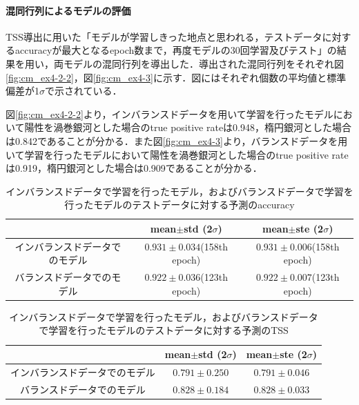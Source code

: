 \documentclass[a4j, 11pt]{jreport}
\begin{document}
\paragraph{混同行列によるモデルの評価}
TSS導出に用いた「モデルが学習しきった地点と思われる，テストデータに対するaccuracyが最大となるepoch数まで，再度モデルの30回学習及びテスト」の結果を用い，両モデルの混同行列を導出した．導出された混同行列をそれぞれ図\ref{fig:cm_ex4-2-2}，図\ref{fig:cm_ex4-3}に示す．図にはそれぞれ個数の平均値と標準偏差が1$\sigma$で示されている．

図\ref{fig:cm_ex4-2-2}より，インバランスドデータを用いて学習を行ったモデルにおいて陽性を渦巻銀河とした場合のtrue positive rateは0.948，楕円銀河とした場合は0.842であることが分かる．また図\ref{fig:cm_ex4-3}より，バランスドデータを用いて学習を行ったモデルにおいて陽性を渦巻銀河とした場合のtrue positive rateは0.919，楕円銀河とした場合は0.909であることが分かる．

\begin{table}[htbp]
  \centering
	\caption{インバランスドデータで学習を行ったモデル，およびバランスドデータで学習を行ったモデルのテストデータに対する予測のaccuracy}
  \begin{tabular}{|c|c|c|}
		\hline
    & mean$\pm$std (2$\sigma$) & mean$\pm$ste (2$\sigma$) \\ \hline
    インバランスドデータでのモデル & $0.931 \pm 0.034$(158th epoch) & $0.931 \pm 0.006$(158th epoch) \\ \hline
    バランスドデータでのモデル & $0.922 \pm 0.036$(123th epoch) & $0.922 \pm 0.007$(123th epoch) \\ \hline
  \end{tabular}
  \label{tb:accs_4.3}
\end{table}

\begin{table}[htbp]
  \centering
	\caption{インバランスドデータで学習を行ったモデル，およびバランスドデータで学習を行ったモデルのテストデータに対する予測のTSS}
  \begin{tabular}{|c|c|c|}
		\hline
    & mean$\pm$std (2$\sigma$) & mean$\pm$ste (2$\sigma$) \\ \hline
    インバランスドデータでのモデル & $0.791 \pm 0.250$ & $0.791 \pm 0.046$ \\ \hline
    バランスドデータでのモデル & $0.828 \pm 0.184$ & $0.828 \pm 0.033$ \\ \hline
  \end{tabular}
  \label{tb:TSS_4.3}
\end{table}
\end{document}
